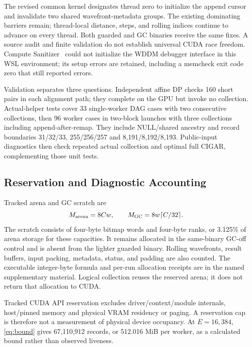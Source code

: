 \documentclass[conference,a4paper]{IEEEtran}
\begin{document}
The revised common kernel designates thread zero to initialize the append cursor and invalidate two shared wavefront-metadata groups. The existing dominating barriers remain; thread-local distance, steps, and rolling indices continue to advance on every thread. Both guarded and GC binaries receive the same fixes. A source audit and finite validation do not establish universal CUDA race freedom. Compute Sanitizer~\cite{sanitizer2026} could not initialize the WDDM debugger interface in this WSL environment; its setup errors are retained, including a memcheck exit code zero that still reported errors.

Validation separates three questions. Independent affine DP checks 160 short pairs in each alignment path; they complete on the GPU but invoke no collection. Actual-helper tests cover 33 single-worker DAG cases with two consecutive collections, then 96 worker cases in two-block launches with three collections including append-after-remap. They include NULL/shared ancestry and record boundaries 31/32/33, 255/256/257 and 8,191/8,192/8,193. Public-input diagnostics then check repeated actual collection and optimal full CIGAR, complementing those unit tests.

\subsection{Reservation and Diagnostic Accounting}
Tracked arena and GC scratch are
\begin{equation}M_{\rm arena}=8Cw,\qquad M_{\rm GC}=8w\lceil C/32\rceil.\label{eq:memory}\end{equation}
The scratch consists of four-byte bitmap words and four-byte ranks, or 3.125\% of arena storage for these capacities. It remains allocated in the same-binary GC-off control and is absent from the lighter guarded binary. Rolling wavefronts, result buffers, input packing, metadata, status, and padding are also counted. The executable integer-byte formula and per-run allocation receipts are in the named supplementary material. Logical collection reuses the reserved arena; it does not return that allocation to CUDA.

Tracked CUDA API reservation excludes driver/context/module internals, host/pinned memory and physical VRAM residency or paging. A reservation cap is therefore not a measurement of physical device occupancy. At $E=16,384$, \eqref{eq:bound} gives 67,110,912 records, or 512.016 MiB per worker, as a calculated bound rather than observed liveness.
\end{document}

